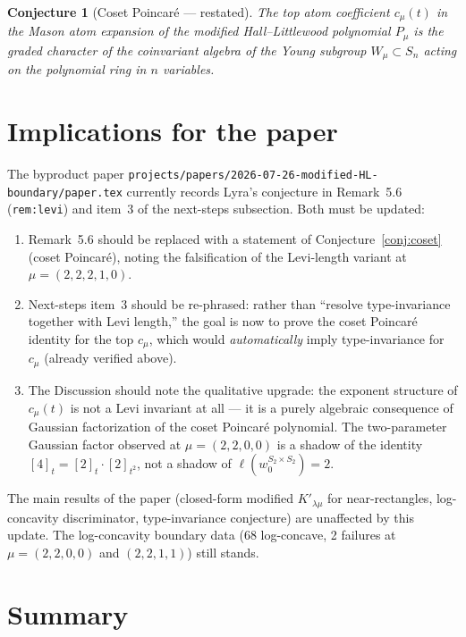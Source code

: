 \documentclass[11pt,letterpaper]{amsart}
\newtheorem{conjecture}[theorem]{Conjecture}
\theoremstyle{definition}
\theoremstyle{remark}
\newcommand{\gauss}[1]{[#1]_{t}}
\newcommand{\gaussm}[2]{[#1]_{t^{#2}}}
\begin{document}
\begin{conjecture}[Coset Poincar\'e --- restated]
The top atom coefficient $c_\mu(t)$ in the Mason atom expansion of the
modified Hall--Littlewood polynomial $P_\mu$ is the graded character
of the coinvariant algebra of the Young subgroup $W_\mu \subset S_n$
acting on the polynomial ring in $n$ variables.
\end{conjecture}

\section{Implications for the paper}

The byproduct paper \texttt{projects/papers/2026-07-26-modified-HL-boundary/paper.tex}
currently records Lyra's conjecture in Remark~5.6 (\texttt{rem:levi})
and item~3 of the next-steps subsection. Both must be updated:

\begin{enumerate}
\item Remark~5.6 should be replaced with a statement of
  Conjecture~\ref{conj:coset} (coset Poincar\'e), noting the
  falsification of the Levi-length variant at $\mu = (2,2,2,1,0)$.
\item Next-steps item~3 should be re-phrased: rather than ``resolve
  type-invariance together with Levi length,'' the goal is now to prove
  the coset Poincar\'e identity for the top $c_\mu$, which would
  \emph{automatically} imply type-invariance for $c_\mu$ (already
  verified above).
\item The Discussion should note the qualitative upgrade: the exponent
  structure of $c_\mu(t)$ is not a Levi invariant at all --- it is a
  purely algebraic consequence of Gaussian factorization of the coset
  Poincar\'e polynomial. The two-parameter Gaussian factor observed at
  $\mu = (2,2,0,0)$ is a shadow of the identity
  $\gauss{4} = \gauss{2}\cdot\gaussm{2}{2}$, not a shadow of $\ell(w_0^{S_2\times S_2}) = 2$.
\end{enumerate}

The main results of the paper (closed-form modified $K'_{\lambda\mu}$
for near-rectangles, log-concavity discriminator, type-invariance
conjecture) are unaffected by this update. The log-concavity boundary
data (68 log-concave, 2 failures at $\mu = (2,2,0,0)$ and $(2,2,1,1)$)
still stands.

\section{Summary}
\end{document}
